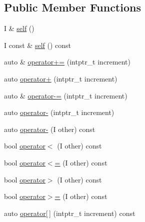 \subsection*{Public Member Functions}
\begin{DoxyCompactItemize}
\item 
I \& \mbox{\hyperlink{structrah_1_1iterator__facade_3_01_i_00_01_r_00_01std_01_1_1random__access__iterator__tag_01_4_a9890aae591eb465ddb7cbc3db9fc6218}{self}} ()
\item 
I const  \& \mbox{\hyperlink{structrah_1_1iterator__facade_3_01_i_00_01_r_00_01std_01_1_1random__access__iterator__tag_01_4_a8c4e4f5eb14eec47622cee38dcfd07ec}{self}} () const
\item 
auto \& \mbox{\hyperlink{structrah_1_1iterator__facade_3_01_i_00_01_r_00_01std_01_1_1random__access__iterator__tag_01_4_a402cdbd9f04329b426493ad03a310e9b}{operator+=}} (intptr\+\_\+t increment)
\item 
auto \mbox{\hyperlink{structrah_1_1iterator__facade_3_01_i_00_01_r_00_01std_01_1_1random__access__iterator__tag_01_4_afe60d943be2c52381038c8466d19d10c}{operator+}} (intptr\+\_\+t increment)
\item 
auto \& \mbox{\hyperlink{structrah_1_1iterator__facade_3_01_i_00_01_r_00_01std_01_1_1random__access__iterator__tag_01_4_adb8fa0019d3c70c3aeac51fb4b3979ea}{operator-\/=}} (intptr\+\_\+t increment)
\item 
auto \mbox{\hyperlink{structrah_1_1iterator__facade_3_01_i_00_01_r_00_01std_01_1_1random__access__iterator__tag_01_4_a1e4f51ffa6ad59080d730e2f2f729f72}{operator-\/}} (intptr\+\_\+t increment)
\item 
auto \mbox{\hyperlink{structrah_1_1iterator__facade_3_01_i_00_01_r_00_01std_01_1_1random__access__iterator__tag_01_4_ad4cd9ec1ee01da50455721636b9388dc}{operator-\/}} (I other) const
\item 
bool \mbox{\hyperlink{structrah_1_1iterator__facade_3_01_i_00_01_r_00_01std_01_1_1random__access__iterator__tag_01_4_a87b6e1c4e4791b8e092923798d075a1e}{operator$<$}} (I other) const
\item 
bool \mbox{\hyperlink{structrah_1_1iterator__facade_3_01_i_00_01_r_00_01std_01_1_1random__access__iterator__tag_01_4_a000bab93b6f148c784d7ec1a189cfd57}{operator$<$=}} (I other) const
\item 
bool \mbox{\hyperlink{structrah_1_1iterator__facade_3_01_i_00_01_r_00_01std_01_1_1random__access__iterator__tag_01_4_aa2d1ab12b4e18c684e1aa27eb59fa98a}{operator$>$}} (I other) const
\item 
bool \mbox{\hyperlink{structrah_1_1iterator__facade_3_01_i_00_01_r_00_01std_01_1_1random__access__iterator__tag_01_4_ad4157f96e62b76e6104c1c05b6921796}{operator$>$=}} (I other) const
\item 
auto \mbox{\hyperlink{structrah_1_1iterator__facade_3_01_i_00_01_r_00_01std_01_1_1random__access__iterator__tag_01_4_a1d3b1a0f2ed941c21df33d21ee5789fc}{operator\mbox{[}$\,$\mbox{]}}} (intptr\+\_\+t increment) const
\end{DoxyCompactItemize}


